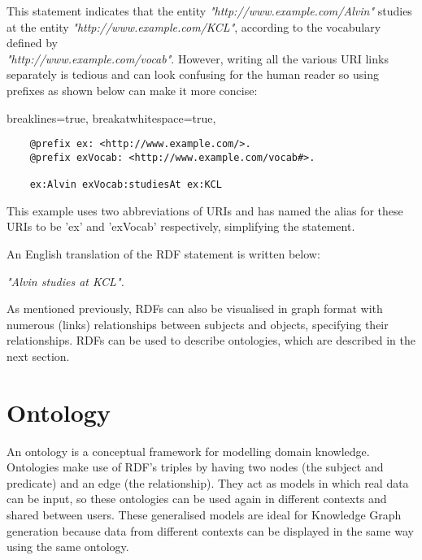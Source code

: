 This statement indicates that the entity \textit{"http://www.example.com/Alvin"} studies at the entity \textit{"http://www.example.com/KCL"}, according to the vocabulary defined by \\\textit{"http://www.example.com/vocab"}. However, writing all the various URI links separately is tedious and can look confusing for the human reader so using prefixes as shown below can make it more concise:

\vspace{-0.2cm}
\lstset
{
    breaklines=true,
    breakatwhitespace=true,
}
\begin{center}
\begin{lstlisting}
    @prefix ex: <http://www.example.com/>. 
    @prefix exVocab: <http://www.example.com/vocab#>. 

    ex:Alvin exVocab:studiesAt ex:KCL
\end{lstlisting}
\end{center} 
\vspace{-0.2cm}

This example uses two abbreviations of URIs and has named the alias for these URIs to be 'ex' and 'exVocab' respectively, simplifying the statement. 

An English translation of the RDF statement is written below: 

\vspace{-0.1cm}
\begin{center}
    \textit{"Alvin studies at KCL". }
\end{center}
\vspace{-0.1cm}

As mentioned previously, RDFs can also be visualised in graph format with numerous (links) relationships between subjects and objects, specifying their relationships. RDFs can be used to describe ontologies, which are described in the next section.

\section{Ontology}
\hspace{0.5cm} An ontology is a conceptual framework for modelling domain knowledge. \cite{ontology} Ontologies make use of RDF's triples by having two nodes (the subject and predicate) and an edge (the relationship). They act as models in which real data can be input, so these ontologies can be used again in different contexts and shared between users. These generalised models are ideal for Knowledge Graph generation because data from different contexts can be displayed in the same way using the same ontology. 

